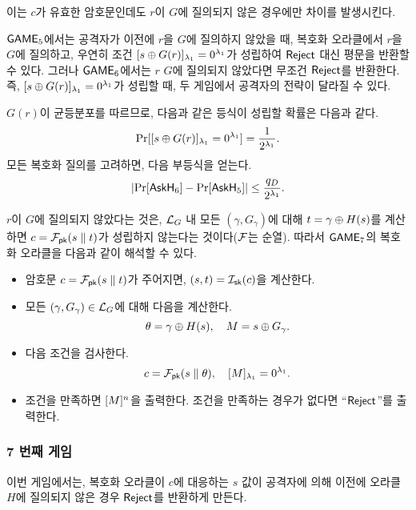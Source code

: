 이는 $c$가 유효한 암호문인데도 $r$이 $G$에 질의되지 않은 경우에만 차이를
발생시킨다. 

\begin{memo}
	$\game_5$에서는 공격자가 이전에 $r$을 $G$에 질의하지 않았을 때, 복호화
	오라클에서 $r$을 $G$에 질의하고, 우연히 조건 $[s \oplus G(r)]_{\sp_1} =
	0^{\sp_1}$가 성립하여 $\reject$ 대신 평문을 반환할 수 있다. 그러나
	$\game_6$에서는 $r$ $G$에 질의되지 않았다면 무조건 $\reject$를 반환한다. 즉,
	$[s \oplus G(r)]_{\sp_1} = 0^{\sp_1}$가 성립할 때, 두 게임에서 공격자의
	전략이 달라질 수 있다.
\end{memo}

$G(r)$이 균등분포를 따르므로, 다음과 같은 등식이 성립할 확률은 다음과 같다.
$$
	\Pr[[s \oplus G(r)]_{\sp_1} = 0^{\sp_1}] = \frac{1}{2^{\sp_1}}.
$$
모든 복호화 질의를 고려하면, 다음 부등식을 얻는다.
$$	
	\left| \Pr[\askH_6] - \Pr[\askH_5] \right| \leq \frac{q_D}{2^{\sp_1}}.
$$

\begin{memo}
	$r$이 $G$에 질의되지 않았다는 것은, $\orcl_G$ 내 모든 $(\gamma,
	G_{\gamma})$에 대해 $t = \gamma \xor H(s)$를 계산하면 $c = \td_{\pk}(s
	\parallel t)$가 성립하지 않는다는 것이다($\td$는 순열).
	따라서 $\game_7$의 복호화 오라클을 다음과 같이 해석할 수 있다.
	\begin{tcolorbox}
		\begin{itemize}
			\item 암호문 $c = \td_{\pk}(s \parallel t)$가 주어지면, $(s,t) =
			\itd_{\sk}(\ct)$을 계산한다.
			\item 모든 $(\gamma, G_\gamma) \in \orcl_G$에 대해 다음을 계산한다.
			$$
				\theta = \gamma \xor H(s), \quad M = s \xor G_{\gamma}.
			$$
			\item 다음 조건을 검사한다.
			$$
				c = \td_{\pk}(s \parallel \theta), \quad [M]_{\sp_1} = 0^{\sp_1}.
			$$
			\item 조건을 만족하면 $[M]^{\mlen}$을 출력한다. 조건을 만족하는
			경우가 없다면 “$\reject$”를 출력한다.
		\end{itemize}
	\end{tcolorbox}
\end{memo}

\newpage
\subsubsection{7 번째 게임}

이번 게임에서는, 복호화 오라클이 $c$에 대응하는 $s$ 값이 공격자에 의해 이전에
오라클 $H$에 질의되지 않은 경우 $\reject$를 반환하게 만든다. 

